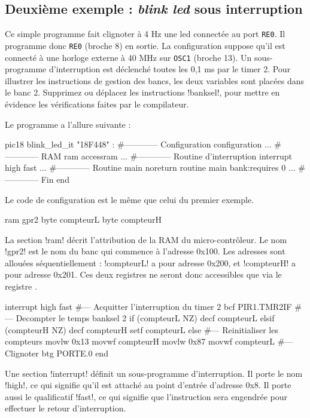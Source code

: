 \subsection{Deuxième exemple : \emph{blink led} sous interruption}

Ce simple programme fait clignoter à 4 Hz une led connectée au port \texttt{RE0}. Il programme donc \texttt{RE0} (broche 8) en sortie. La configuration suppose qu'il est connecté à une horloge externe à 40 MHz sur \texttt{OSC1} (broche 13). Un sous-programme d'interruption est déclenché toutes les 0,1 ms par le timer 2. Pour illustrer les instructions de gestion des bancs, les deux variables sont placées dans le banc 2. Supprimez ou déplacez les instructions \pic!banksel!, pour mettre en évidence les vérifications faites par le compilateur.

Le programme a l'allure suivante :
\begin{piccolo}
pic18 blink_led_it "18F448" :
#------------ Configuration
configuration {
  ...
}
#------------ RAM
ram accessram {
  ...
}
#------------ Routine d'interruption
interrupt high fast {
  ...
}
#------------ Routine main
noreturn routine main bank:requires 0 {
  ...
}
#------------ Fin
end
\end{piccolo}

Le code de configuration est le même que celui du premier exemple.


\begin{piccolo}
ram gpr2 {
  byte compteurL
  byte compteurH
}
\end{piccolo}
La section \pic!ram! décrit l’attribution de la RAM du micro-contrôleur. Le nom \pic!gpr2! est le nom du banc qui commence à l’adresse 0x100. Les adresses sont allouées séquentiellement : \pic!compteurL! a pour adresse 0x200, et \pic!compteurH! a pour adresse 0x201. Ces deux registres ne seront donc accessibles que via le registre .


\begin{piccolo}
interrupt high fast {
#--- Acquitter l'interruption du timer 2 
  bcf  PIR1.TMR2IF 
#--- Decompter le temps
  banksel 2 
  if (compteurL NZ)
    decf compteurL
  elsif (compteurH NZ)
    decf compteurH
    setf compteurL
  else
  #--- Reinitialiser les compteurs
    movlw  0x13
    movwf  compteurH
    movlw  0x87
    movwf  compteurL
  #--- Clignoter
    btg  PORTE.0
  end
}
\end{piccolo}
Une section \pic!interrupt! définit un sous-programme d’interruption. Il porte le nom \pic!high!, ce qui signifie qu’il est attaché au point d’entrée d’adresse 0x8. Il porte aussi le qualificatif \pic!fast!, ce qui signifie que l’instruction  sera engendrée pour effectuer le retour d’interruption.


